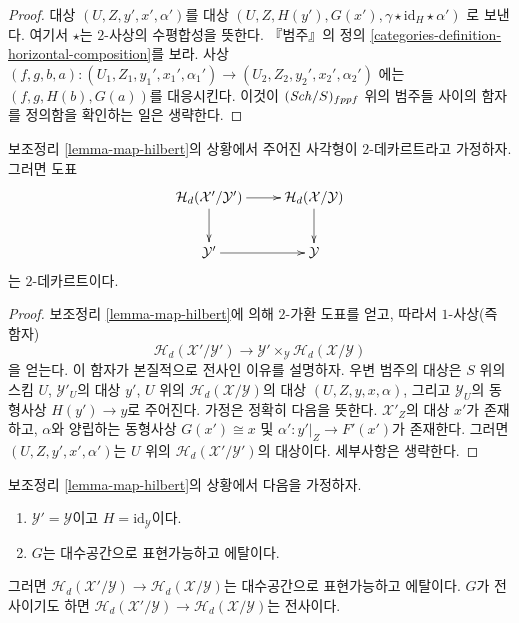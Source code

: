\begin{proof}
대상 $(U, Z, y', x', \alpha')$를 대상
$(U, Z, H(y'), G(x'), \gamma \star \text{id}_H \star \alpha')$
로 보낸다. 여기서 $\star$는 $2$-사상의 수평합성을 뜻한다.
『범주』의 정의 \ref{categories-definition-horizontal-composition}를 보라.
사상
$(f, g, b, a) :
(U_1, Z_1, y_1', x_1', \alpha_1') \to (U_2, Z_2, y_2', x_2', \alpha_2')$
에는 $(f, g, H(b), G(a))$를 대응시킨다. 이것이
$(\mathit{Sch}/S)_{fppf}$ 위의 범주들 사이의 함자를 정의함을 확인하는 일은
생략한다.
\end{proof}

\begin{lemma}
\label{lemma-cartesian-map-hilbert}
보조정리 \ref{lemma-map-hilbert}의 상황에서 주어진 사각형이
$2$-데카르트라고 가정하자. 그러면 도표
$$
\xymatrix{
\mathcal{H}_d(\mathcal{X}'/\mathcal{Y}') \ar[r] \ar[d] &
\mathcal{H}_d(\mathcal{X}/\mathcal{Y}) \ar[d] \\
\mathcal{Y}' \ar[r] &
\mathcal{Y}
}
$$
는 $2$-데카르트이다.
\end{lemma}

\begin{proof}
보조정리 \ref{lemma-map-hilbert}에 의해 $2$-가환 도표를 얻고,
따라서 $1$-사상(즉 함자)
$$
\mathcal{H}_d(\mathcal{X}'/\mathcal{Y}')
\longrightarrow
\mathcal{Y}' \times_\mathcal{Y} \mathcal{H}_d(\mathcal{X}/\mathcal{Y})
$$
을 얻는다. 이 함자가 본질적으로 전사인 이유를 설명하자.
우변 범주의 대상은 $S$ 위의 스킴 $U$,
$\mathcal{Y}'_U$의 대상 $y'$, $U$ 위의
$\mathcal{H}_d(\mathcal{X}/\mathcal{Y})$의 대상
$(U, Z, y, x, \alpha)$, 그리고 $\mathcal{Y}_U$의 동형사상
$H(y') \to y$로 주어진다. 가정은 정확히 다음을 뜻한다.
$\mathcal{X}'_Z$의 대상 $x'$가 존재하고, $\alpha$와 양립하는
동형사상 $G(x') \cong x$ 및
$\alpha' : y'|_Z \to F'(x')$가 존재한다. 그러면
$(U, Z, y', x', \alpha')$는 $U$ 위의
$\mathcal{H}_d(\mathcal{X}'/\mathcal{Y}')$의 대상이다.
세부사항은 생략한다.
\end{proof}

\begin{lemma}
\label{lemma-etale-covering-hilbert}
보조정리 \ref{lemma-map-hilbert}의 상황에서 다음을 가정하자.
\begin{enumerate}
\item $\mathcal{Y}' = \mathcal{Y}$이고 $H = \text{id}_\mathcal{Y}$이다.
\item $G$는 대수공간으로 표현가능하고 에탈이다.
\end{enumerate}
그러면 $\mathcal{H}_d(\mathcal{X}'/\mathcal{Y}) \to
\mathcal{H}_d(\mathcal{X}/\mathcal{Y})$는 대수공간으로 표현가능하고
에탈이다. $G$가 전사이기도 하면
$\mathcal{H}_d(\mathcal{X}'/\mathcal{Y}) \to
\mathcal{H}_d(\mathcal{X}/\mathcal{Y})$는 전사이다.
\end{lemma}

